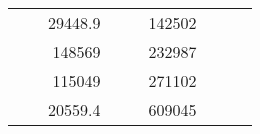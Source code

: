 \begin{table}[H]
\begin{tabular}{|ccrccrccc}
\multicolumn{1}{|c|}{\cellcolor[HTML]{FFFFC7}}                                & \multicolumn{1}{c|}{\cellcolor[HTML]{DDFDFF}}                      & \multicolumn{1}{r|}{\cellcolor[HTML]{DAE8FC}29448.9}   & \multicolumn{1}{c|}{\cellcolor[HTML]{FFFFC7}}                                & \multicolumn{1}{c|}{\cellcolor[HTML]{DDFDFF}}                       & \multicolumn{1}{r|}{\cellcolor[HTML]{DDFDFF}142502}    &                                                                              &                                                                    &                                                        \\ \cline{3-3} \cline{6-6}
\multicolumn{1}{|c|}{\cellcolor[HTML]{FFFFC7}}                                & \multicolumn{1}{c|}{\cellcolor[HTML]{DDFDFF}}                      & \multicolumn{1}{r|}{\cellcolor[HTML]{DDFDFF}148569}    & \multicolumn{1}{c|}{\cellcolor[HTML]{FFFFC7}}                                & \multicolumn{1}{c|}{\cellcolor[HTML]{DDFDFF}}                       & \multicolumn{1}{r|}{\cellcolor[HTML]{DAE8FC}232987}    &                                                                              &                                                                    &                                                        \\ \cline{3-3} \cline{6-6}
\multicolumn{1}{|c|}{\cellcolor[HTML]{FFFFC7}}                                & \multicolumn{1}{c|}{\cellcolor[HTML]{DDFDFF}}                      & \multicolumn{1}{r|}{\cellcolor[HTML]{DAE8FC}115049}    & \multicolumn{1}{c|}{\cellcolor[HTML]{FFFFC7}}                                & \multicolumn{1}{c|}{\cellcolor[HTML]{DDFDFF}}                       & \multicolumn{1}{r|}{\cellcolor[HTML]{DDFDFF}271102}    &                                                                              &                                                                    &                                                        \\ \cline{3-3} \cline{6-6}
\multicolumn{1}{|c|}{\cellcolor[HTML]{FFFFC7}}                                & \multicolumn{1}{c|}{\cellcolor[HTML]{DDFDFF}}                      & \multicolumn{1}{r|}{\cellcolor[HTML]{DDFDFF}20559.4}   & \multicolumn{1}{c|}{\cellcolor[HTML]{FFFFC7}}                                & \multicolumn{1}{c|}{\cellcolor[HTML]{DDFDFF}}                       & \multicolumn{1}{r|}{\cellcolor[HTML]{DAE8FC}609045}    &                                                                              &                                                                    &                                                        \\ \cline{3-3} \cline{6-6}

\end{tabular}
\end{table}
